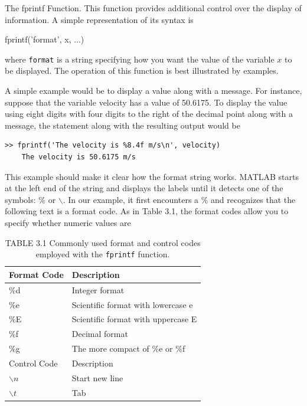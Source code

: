 \documentclass[../main.tex]{subfiles}
\begin{document}
The fprintf Function. This function provides additional control over the display of
information. A simple representation of its syntax is

fprintf('format', x, ...)


where \texttt{format} is a string specifying how you want the value of the variable $x$ to be displayed. The 
operation of this function is best illustrated by examples.


A simple example would be to display a value along with a message. For instance, suppose that the variable 
{velocity} has a value of 50.6175. To display the value using eight
digits with four digits to the right of the decimal point along with a message, the statement
along with the resulting output would be
\begin{lstlisting}[frame=none, numbers=none]
    >> fprintf('The velocity is %8.4f m/s\n', velocity)
    The velocity is 50.6175 m/s
\end{lstlisting}
This example should make it clear how the format string works. MATLAB starts at
the left end of the string and displays the labels until it detects one of the symbols: $\%$ or $\backslash$.
In our example, it first encounters a $\%$ and recognizes that the following text is a format
code. As in Table 3.1, the format codes allow you to specify whether numeric values are

\begin{table}[H]
    \centering
    \caption*{TABLE 3.1 Commonly used format and control codes employed
    with the \texttt{fprintf} function.}
    \begin{tabular}{ll }
            \hline
            Format Code& Description\\
            \hline
            $\%$d& Integer format\\
            $\%$e &Scientific format with lowercase e\\
            $\%$E &Scientific format with uppercase E\\
            $\%$f &Decimal format\\
            $\%$g &The more compact of $\%$e or $\%$f\\
            Control Code &Description\\
            \hline
            $\backslash n$ &Start new line\\
            $\backslash t$ &Tab\\
            \hline
    \end{tabular}	
\end{table}
\end{document}
